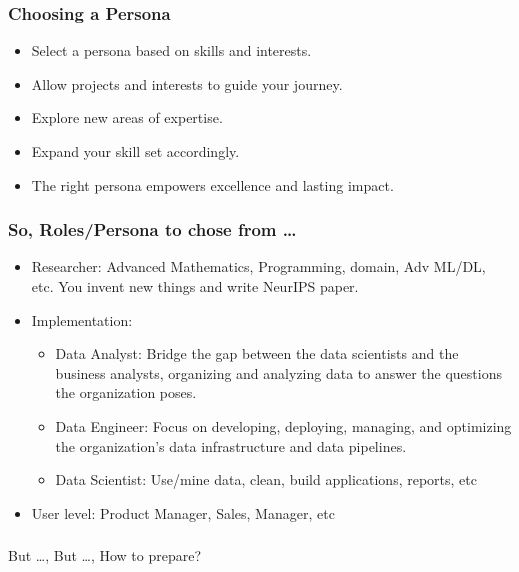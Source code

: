 \begin{frame}[fragile]\frametitle{Choosing a Persona}
        \begin{itemize}
            \item Select a persona based on skills and interests.
            \item Allow projects and interests to guide your journey.
            \item Explore new areas of expertise.
            \item Expand your skill set accordingly.
            \item The right persona empowers excellence and lasting impact.
        \end{itemize}
\end{frame}


\begin{frame}[fragile]\frametitle{So, Roles/Persona to chose from \ldots}
\begin{itemize}
\item Researcher: Advanced Mathematics, Programming, domain, Adv ML/DL, etc. You invent new things and write NeurIPS paper.
\item Implementation:
	\begin{itemize}
	\item Data Analyst: Bridge the gap between the data scientists and the business analysts, organizing and analyzing data to answer the questions the organization poses. 
	\item Data Engineer: Focus on developing, deploying, managing, and optimizing the organization’s data infrastructure and data pipelines.
	\item Data Scientist: Use/mine data, clean, build applications, reports, etc
	\end{itemize}
\item User level: Product Manager, Sales, Manager, etc
\end{itemize}
\end{frame}

\begin{frame}[fragile]\frametitle{}
	
	\begin{center}
	{\Large But \ldots, But \ldots, How to prepare?}  
	\end{center}

\end{frame}

